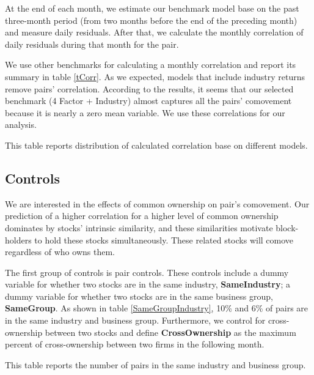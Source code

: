 \documentclass[12pt, a4paper]{article}
\begin{document}
At the end of each month, we estimate our benchmark model base on the past three-month period (from two months before the end of the preceding month) and measure daily residuals.  After that, we calculate the monthly correlation of daily residuals during that month for the pair.

We use other benchmarks for calculating a monthly correlation and report its summary in table \ref{tCorr}. 
As we expected,  models that include industry returns remove pairs' correlation. According to the results, it seems that our selected benchmark (4 Factor + Industry) almost captures all the pairs' comovement because it is nearly a zero mean variable. We use these correlations for our analysis.

     
 \begin{table}[htbp]
        \centering
        \caption{\footnotesize This table reports distribution of calculated correlation base on different models.}
        \label{tCorr}
        \resizebox{1\textwidth}{!}
        {
        
         }
      \end{table}
      

\FloatBarrier
\subsection{Controls}
We are interested in the effects of common ownership on pair's comovement.
Our prediction of a higher correlation for a higher level of common ownership dominates by stocks' intrinsic similarity, and these similarities motivate block-holders to hold these stocks simultaneously. These related stocks will comove regardless of who owns them.

The first group of controls is pair controls. These controls include
a dummy variable for whether two stocks are in the same industry, \textbf{SameIndustry}; a dummy variable for whether two stocks are in the same business group, \textbf{SameGroup}. As shown in table \ref{SameGroupIndustry}, 10\% and 6\%  of pairs are in the same industry and business group. Furthermore, we control for cross-ownership between two stocks and define  \textbf{CrossOwnership} as the maximum percent of cross-ownership between two firms in the following month.


\begin{table}[htbp]
\caption{\scriptsize This table reports the number of pairs in the same industry and business group.}
\label{SameGroupIndustry}
               \centering \scriptsize
         {

                 }
             \end{table}
\end{document}
